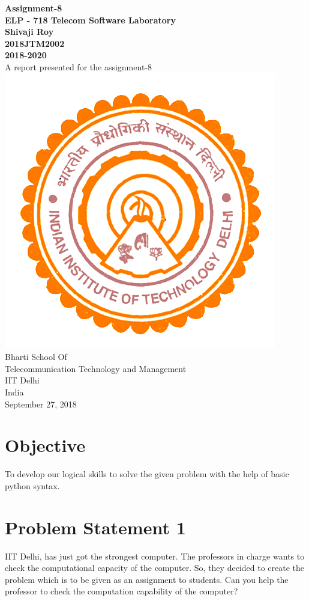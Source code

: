 \documentclass[a4paper,12pt]{article}
\begin{document}
\begin{center}
\textbf{Assignment-8 \\
\vspace{5mm}
ELP - 718 Telecom Software Laboratory \\
\vspace{2mm}
Shivaji Roy \\
2018JTM2002 \\
2018-2020} \\
\vspace{10mm}
A report presented for the assignment-8 \\
\vspace{30mm}
\includegraphics[scale=0.5]{iitlogo} \\
\vspace{10mm}
Bharti School Of \\
Telecommunication Technology and Management \\
IIT Delhi \\
India \\
September 27, 2018

\end{center}
\newpage
\tableofcontents
\newpage
\section{Objective}
To develop our logical skills to solve the given problem with the help of basic python syntax.
\section{Problem Statement 1}
IIT Delhi, has just got the strongest computer. The professors in charge wants to check the computational capacity of the computer. So, they decided to create the problem which is to be given as an assignment to students. Can you help the professor to check the computation capability of the computer?
\end{document}
